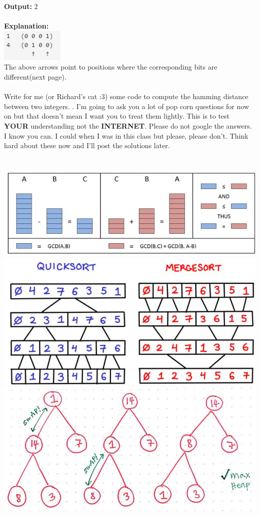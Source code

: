 \documentclass[12pt]{article}
\begin{document}
\textbf{Output: } $2$\\\\
\textbf{Explanation: }\\
\noindent \includegraphics{hamming.jpg}\\
The above arrows point to positions where the corresponding bits are different(next page).\\\\
Write for me (or Richard's cat :3) some code to compute the hamming distance between two integers.
. I'm going to ask you a lot of pop corn questions for now on but that doesn't mean I want you to treat them lightly. This is to test \textbf{YOUR} understanding not the \textbf{INTERNET}. Please do not google the answers. I know you can. I could when I was in this class but please, please don't. Think hard about these now and I'll post the solutions later.\\\\\
\noindent \includegraphics[scale = 0.5]{ea.jpg}
\noindent \includegraphics[scale = 0.35]{qsms.jpg}
\noindent \includegraphics[scale = 0.5]{hs.jpg}\\
\end{document}

